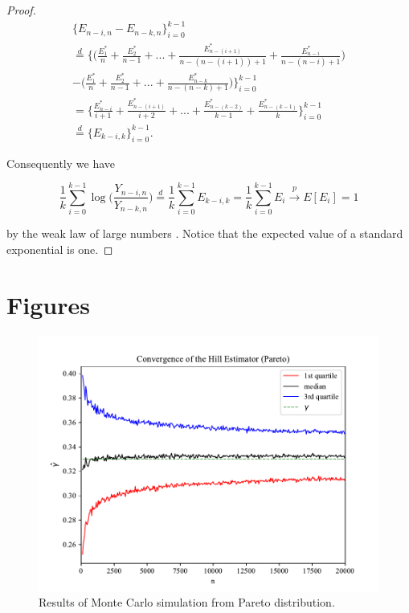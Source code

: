\documentclass[english,12pt,a4paper,pdftex,sci,utf8]{aaltothesis} %
\begin{document}
\begin{proof}
\begin{equation*}
\begin{split}
\big\{E_{n-i,n} - E_{n-k,n}\big\}_{i=0}^{k-1} \\ 
\overset{d}{=} \bigg\{\Big( \frac{E_1^*}{n} + \frac{E_2^*}{n-1}+...+ \frac{E_{n-(i+1)}^*}{n-(n-(i+1))+1} + \frac{E_{n-i}^*}{n-(n-i)+1} \Big) \\
- \Big(\frac{E_1^*}{n} + \frac{E_2^*}{n-1}+...+\frac{E_{n-k}^*}{n-(n-k)+1}\Big)\bigg\}_{i=0}^{k-1} \\
= \bigg\{\frac{E_{n-i}^*}{i+1} + \frac{E_{n-(i+1)}^*}{i+2} +...+ \frac{E_{n-(k-2)}^*}{k-1} + \frac{E_{n-(k-1)}^*}{k}\bigg\}_{i=0}^{k-1} \\
\overset{d}{=} \big\{E_{k-i,k}\big\}_{i=0}^{k-1}.
\end{split}
\end{equation*}

Consequently we have

\begin{equation*}
\frac{1}{k} \sum_{i=0}^{k-1} \log\Big(\frac{Y_{n-i,n}}{Y_{n-k,n}}\Big) \overset{d}{=} \frac{1}{k} \sum_{i=0}^{k-1} E_{k-i,k} = \frac{1}{k} \sum_{i=0}^{k-1} E_i \xrightarrow{p} E[E_i] = 1
\end{equation*}

by the weak law of large numbers \cite{rosenthal}. Notice that the expected value of a standard exponential is one.



\end{proof}

\section{Figures}
\label{figures}

\begin{figure}[H]
\begin{center}
\includegraphics[width=\textwidth]{pareto.pdf}
\caption{Results of Monte Carlo simulation from Pareto distribution.}
\label{pareto}
\end{center}
\end{figure}
\end{document}
